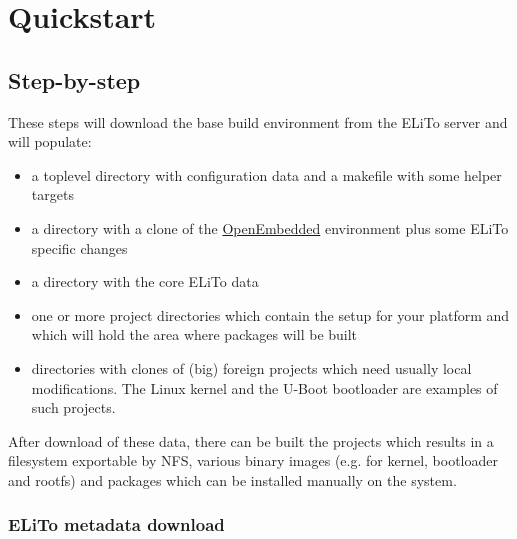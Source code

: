\chapter{Quickstart}
\label{chap:quickstart}

\section{Step-by-step}
\label{sec:quickstart_step-by-step}

These steps will download the base build environment from the ELiTo
server and will populate:

\begin{itemize}
\item a toplevel directory with configuration data and a makefile with
  some helper targets
\item a directory with a clone of the
  \href{http://www.openembedded.org}{OpenEmbedded} environment plus
  some ELiTo specific changes
\item a directory with the core ELiTo data
\item one or more project directories which contain the setup for your
  platform and which will hold the area where packages will be built
\item directories with clones of (big) foreign projects which need
  usually local modifications. The Linux kernel and the U-Boot
  bootloader are examples of such projects.
\end{itemize}

After download of these data, there can be built the projects which
results in a filesystem exportable by NFS, various binary images
(e.g. for kernel, bootloader and rootfs) and packages which can be
installed manually on the system.



\subsection{ELiTo metadata download}
\label{subsec:quickstart_elito-download}

